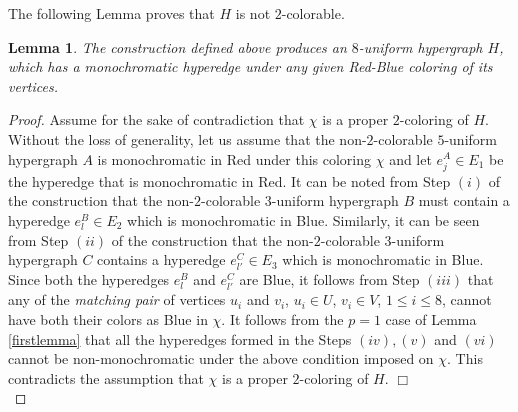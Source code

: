 \documentclass[11pt]{article}
\newtheorem{lemma}{Lemma}
\def\qed{$\Box$}
\begin{document}
\noindent The following Lemma proves that $H$ is not $2$-colorable.
\begin{lemma}
The construction defined above produces an $8$-uniform hypergraph $H$, which has a monochromatic hyperedge under any given Red-Blue coloring of its vertices.
\end{lemma}
\begin{proof}
Assume for the sake of contradiction that $\chi$ is a proper $2$-coloring of $H$. Without the loss of generality, let us assume that the non-$2$-colorable $5$-uniform hypergraph $A$ is monochromatic in Red under this coloring $\chi$ and let $e^A_j \in E_1$ be the hyperedge that is monochromatic in Red. It can be noted from Step $(i)$ of the construction that the non-$2$-colorable $3$-uniform hypergraph $B$ must contain a hyperedge $e^B_l \in E_2$ which is monochromatic in Blue. Similarly, it can be seen from Step $(ii)$ of the construction that the non-$2$-colorable $3$-uniform hypergraph $C$ contains a hyperedge $e^C_{l'} \in E_3$ which is monochromatic in Blue. Since both the hyperedges $e^B_l$ and $e^C_{l'}$ are Blue, it follows from Step $(iii)$ that any of the \textit{matching pair} of vertices $u_i$ and $v_i$, 
$u_i \in U$, $v_i \in V$, $1 \leq i \leq 8$, cannot have both their colors as Blue in $\chi$. It follows from the
$p=1$ case of Lemma \ref{firstlemma} that all the hyperedges formed in the Steps $(iv), (v)$ and $(vi)$ cannot be non-monochromatic under the above condition imposed on $\chi$. This contradicts the assumption that
$\chi$ is a proper $2$-coloring of $H$. \qed
\\
\end{proof}
\end{document}
